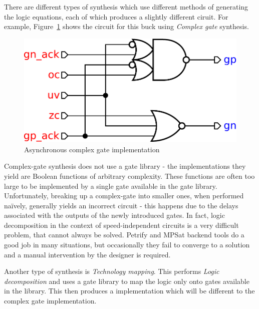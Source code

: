 \documentclass[british,compsoc]{IEEEtran}
\begin{document}
There are different types of synthesis which use different methods of generating the logic equations,
each of which produces a slightly different ciruit. For example, Figure~\ref{fig:complex-gate-circuit} shows the
circuit for this buck using \emph{Complex gate} synthesis.

\begin{figure}[h]
\begin{centering}
\includegraphics[scale=0.3]{Images/complex-gate-circuit-buck}
\par\end{centering}

\protect\caption{\label{fig:complex-gate-circuit}Asynchronous complex gate implementation}
\end{figure}

Complex-gate synthesis does not use a gate library - the implementations they yield are Boolean functions of arbitrary complexity. These functions are often too
large to be implemented by a single gate available in the gate library. Unfortunately, breaking up a complex-gate into smaller ones, when performed naïvely, generally yields an incorrect
circuit - this happens due to the delays associated with the outputs of the newly introduced gates. In fact, logic decomposition in the context of speed-independent circuits is a very
difficult problem, that cannot always be solved. Petrify and MPSat backend tools do a good job in many situations, but occasionally they fail to converge to a solution and a manual
intervention by the designer is required.

Another type of synthesis is \emph{Technology mapping}.
This performs \emph{Logic decomposition} and uses a gate library to map the logic only onto gates available in the library.
This then produces a implementation which will be different to the complex gate implementation.
\end{document}
